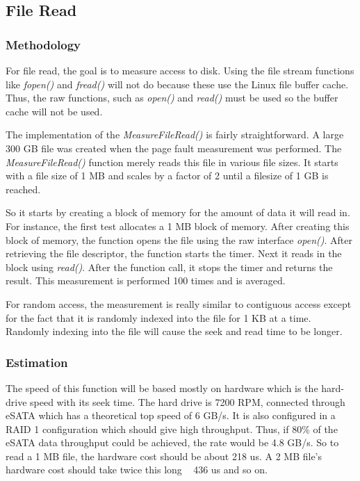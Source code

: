 \documentclass[paper=a4, fontsize=11pt]{scrartcl}
\numberwithin{equation}{section}        %
\numberwithin{figure}{section}          %
\numberwithin{table}{section}               %
\begin{document}
\subsection{File Read}

\subsubsection{Methodology}

For file read, the goal is to measure access to disk.  Using the file stream functions like \textit{fopen()} and \textit{fread()} will not do because these use the Linux file buffer cache.  Thus, the raw functions, such as \textit{open()} and \textit{read()} must be used so the buffer cache will not be used.

The implementation of the \textit{MeasureFileRead()} is fairly straightforward.  A large 300 GB file was created when the page fault measurement was performed.  The \textit{MeasureFileRead()} function merely reads this file in various file sizes.  It starts with a file size of 1 MB and scales by a factor of 2 until a filesize of 1 GB is reached.

So it starts by creating a block of memory for the amount of data it will read in.  For instance, the first test allocates a 1 MB block of memory.  After creating this block of memory, the function opens the file using the raw interface \textit{open()}.  After retrieving the file descriptor, the function starts the timer.  Next it reads in the block using \textit{read()}.  After the function call, it stops the timer and returns the result.  This measurement is performed 100 times and is averaged.

For random access, the measurement is really similar to contiguous access except for the fact that it is randomly indexed into the file for 1 KB at a time.  Randomly indexing into the file will cause the seek and read time to be longer.

\subsubsection{Estimation}

The speed of this function will be based mostly on hardware which is the hard-drive speed with its seek time.  The hard drive is 7200 RPM, connected through eSATA which has a theoretical top speed of 6 GB/s.  It is also configured in a RAID 1 configuration which should give high throughput. Thus, if 80\% of the eSATA data throughput could be achieved, the rate would be 4.8 GB/s.  So to read a 1 MB file, the hardware cost should be about 218 us.  A 2 MB file's hardware cost should take twice this long ~ 436 us and so on.
\end{document}
